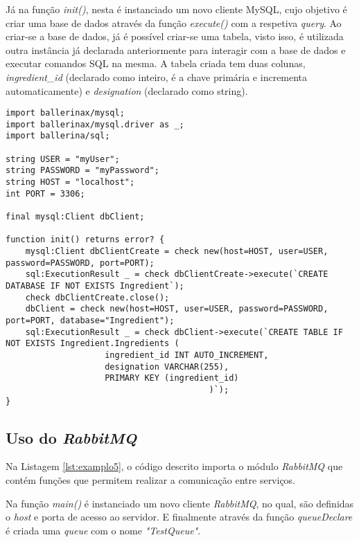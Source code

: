 Já na função \textit{init()}, nesta é instanciado um novo cliente MySQL, cujo objetivo é criar uma base de dados através da função \textit{execute()} com a respetiva \textit{query}. Ao criar-se a base de dados, já é possível criar-se uma tabela, visto isso, é utilizada outra instância já declarada anteriormente para interagir com a base de dados e executar comandos SQL na mesma. A tabela criada tem duas colunas, \textit{ingredient\_id} (declarado como inteiro, é a chave primária e incrementa automaticamente) e \textit{designation} (declarado como string).

\begin{minipage}{0.9\linewidth}
\begin{lstlisting}[language=ballerina, caption=Exemplo de uma coneção a base de dados. , label=lst:examplo4]
import ballerinax/mysql;
import ballerinax/mysql.driver as _; 
import ballerina/sql;

string USER = "myUser";
string PASSWORD = "myPassword";
string HOST = "localhost";
int PORT = 3306;

final mysql:Client dbClient;

function init() returns error? {
    mysql:Client dbClientCreate = check new(host=HOST, user=USER, password=PASSWORD, port=PORT);
    sql:ExecutionResult _ = check dbClientCreate->execute(`CREATE DATABASE IF NOT EXISTS Ingredient`);
    check dbClientCreate.close();
    dbClient = check new(host=HOST, user=USER, password=PASSWORD, port=PORT, database="Ingredient"); 
    sql:ExecutionResult _ = check dbClient->execute(`CREATE TABLE IF NOT EXISTS Ingredient.Ingredients (
                    ingredient_id INT AUTO_INCREMENT,
                    designation VARCHAR(255), 
                    PRIMARY KEY (ingredient_id)
                                         )`);                                
}
\end{lstlisting}
\end{minipage}

\subsection{Uso do \textit{RabbitMQ}}

Na Listagem \ref{lst:examplo5}, o código descrito importa o módulo \textit{RabbitMQ} que contém funções que permitem realizar a comunicação entre serviços.

Na função \textit{main()} é instanciado um novo cliente \textit{RabbitMQ}, no qual, são definidas o \textit{host} e porta de acesso ao servidor. E finalmente através da função \textit{queueDeclare} é criada uma \textit{queue} com o nome \textit{"TestQueue"}.

